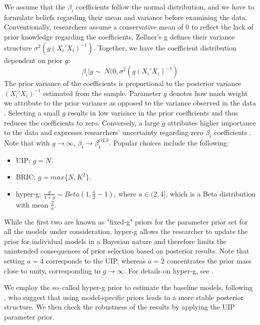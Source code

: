 \begin{refsection}
We assume that the $\beta_{i}$ coefficients follow the normal distribution, and we have to formulate beliefs regarding their mean and variance before examining the data. Conventionally, researchers assume a conservative mean of 0 to reflect the lack of prior knowledge regarding the coefficients. Zellner's g defines their variance structure $\sigma^{2}(g(X_{i}'X_{i})^{-1})$. Together, we have the coefficient distribution dependent on prior $g$:
%
\begin{equation}
	\beta_{i}\vert g \sim\ N(0, \sigma^{2}(g(X_{i}'X_{i})^{-1}) 
\end{equation}
The prior variance of the coefficients is proportional to the posterior variance $(X_{i}'X_{i})^{-1}$ estimated from the sample. Parameter $g$ denotes how much weight we attribute to the prior variance as opposed to the variance observed in the data \parencite{FeldkircherZeugner2009}. Selecting a small $g$ results in low variance in the prior coefficients and thus reduces the coefficients to zero. Conversely, a large $g$ attributes higher importance to the data and expresses researchers' uncertainty regarding zero $\beta_{i}$ coefficients \parencite{Zeugner2011}. Note that with $g \rightarrow \infty$, $\beta_{i} \rightarrow \beta^{OLS}_{i}$. Popular choices include the following:
\begin{itemize}
	\item \ac{UIP}; $g = N$.
	\item \ac{BRIC}; $g = max\{N, K^{2}\}$.
	\item hyper-g; $\frac{g}{1+g} \sim Beta (1, \frac{a}{2} - 1)$, where $a \in (2,4]$, which is a Beta distribution with mean $\frac{2}{a}$.
\end{itemize}
%
While the first two are known as "fixed-g" priors for the parameter prior set for all the models under consideration, hyper-g allows the researcher to update the prior for individual models in a Bayesian nature and therefore limits the unintended consequences of prior selection based on posterior results. Note that setting $a=4$ corresponds to the \ac{UIP}, whereas $a=2$ concentrates the prior mass close to unity, corresponding to $g \rightarrow \infty$. For details on hyper-g, see \textcite{Liangetal2008}.

We employ the so--called hyper-g prior to estimate the baseline models, following \textcite{FeldkircherZeugner2009}, who suggest that using model-specific priors leads to a more stable posterior structure. We then check the robustness  of the results by applying the \ac{UIP} parameter prior.


\end{refsection}
